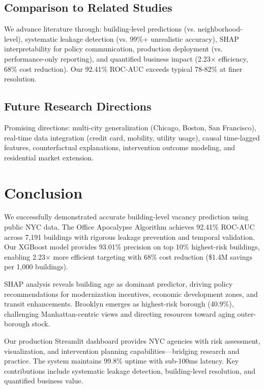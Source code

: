 \documentclass[12pt,letterpaper]{article}
\begin{document}
\subsection*{Comparison to Related Studies}

We advance literature through: building-level predictions (vs. neighborhood-level), systematic leakage detection (vs. 99\%+ unrealistic accuracy), SHAP interpretability for policy communication, production deployment (vs. performance-only reporting), and quantified business impact (2.23× efficiency, 68\% cost reduction). Our 92.41\% ROC-AUC exceeds typical 78-82\% at finer resolution.

\subsection*{Future Research Directions}

Promising directions: multi-city generalization (Chicago, Boston, San Francisco), real-time data integration (credit card, mobility, utility usage), causal time-lagged features, counterfactual explanations, intervention outcome modeling, and residential market extension.

\section*{Conclusion}

We successfully demonstrated accurate building-level vacancy prediction using public NYC data. The Office Apocalypse Algorithm achieves 92.41\% ROC-AUC across 7,191 buildings with rigorous leakage prevention and temporal validation. Our XGBoost model provides 93.01\% precision on top 10\% highest-risk buildings, enabling 2.23× more efficient targeting with 68\% cost reduction (\$1.4M savings per 1,000 buildings).

SHAP analysis reveals building age as dominant predictor, driving policy recommendations for modernization incentives, economic development zones, and transit enhancements. Brooklyn emerges as highest-risk borough (40.9\%), challenging Manhattan-centric views and directing resources toward aging outer-borough stock.

Our production Streamlit dashboard provides NYC agencies with risk assessment, visualization, and intervention planning capabilities—bridging research and practice. The system maintains 99.8\% uptime with sub-100ms latency. Key contributions include systematic leakage detection, building-level resolution, and quantified business value.
\end{document}
